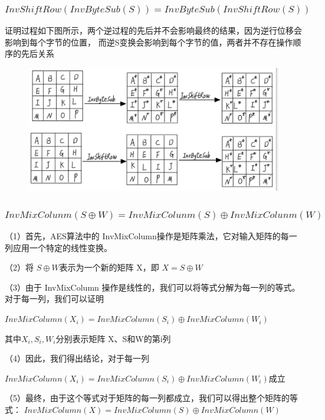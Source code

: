 \documentclass[a4paper,11pt,UTF8]{ctexart}
\newcommand{\bottomcaption}{%
\setlength{\abovecaptionskip}{6pt}%
\setlength{\belowcaptionskip}{6pt}%
\caption}
\newcommand{\xiaowuhao}{\fontsize{9pt}{\baselineskip}\selectfont}   %
\begin{document}
        \subsubsection{$InvShiftRow(InvByteSub(S))= InvByteSub(InvShiftRow(S))$}
            证明过程如下图所示，两个逆过程的先后并不会影响最终的结果，因为逆行位移会影响到每个字节的位置，
            而逆S变换会影响到每个字节的值，两者并不存在操作顺序的先后关系
            \begin{figure}[H]
                \centering
                \includegraphics[width=13cm]{证明1.jpg}
                \bottomcaption{\xiaowuhao{证明1}}
            \end{figure}

        \subsubsection{$InvMixColunm(S\oplus W)= InvMixColunm(S)\oplus InvMixColunm(W)$}

            （1）首先，AES算法中的 InvMixColumn操作是矩阵乘法，它对输入矩阵的每一列应用一个特定的线性变换。\par
            （2）将 $S \oplus W$表示为一个新的矩阵 X，即 $X=S\oplus W$\par
            （3）由于 InvMixColumn 操作是线性的，我们可以将等式分解为每一列的等式。对于每一列，我们可以证明 \par
                $InvMixColumn(X_{i})=InvMixColumn(S_{i}) \oplus InvMixColumn(W_{i})$\par
                其中$X_{i},S_{i},W_{i}$分别表示矩阵 X、S和W的第i列\par
            （4）因此，我们得出结论，对于每一列\par
            $InvMixColumn(X_{i})=InvMixColumn(S_{i}) \oplus InvMixColumn(W_{i})$成立\par
            （5）最终，由于这个等式对于矩阵的每一列都成立，我们可以得出整个矩阵的等式：
            $InvMixColumn(X)=InvMixColumn(S) \oplus InvMixColumn(W)$
\end{document}
